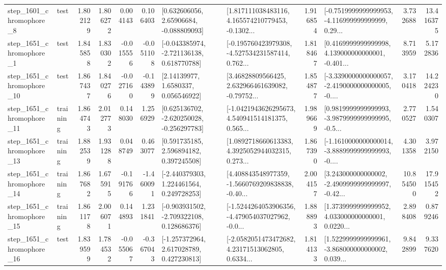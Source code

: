 \begin{tabular}{llrrrrllrlrr}
  step\_1601\_chromophore\_8 &      test &      1.802129 &    1.806272 &      0.004143 &  0.106403 &     [0.632606056, 2.65906684, -0.088809093] &  [1.817111038483116, 4.165574210779453, -0.1302... &       1.916854 &  [-0.7519999999999953, -4.116999999999999, 0.29... &            3.732688 &         13.416375 \\
  step\_1651\_chromophore\_1 &      test &      1.845858 &    1.830302 &     -0.015556 & -0.051108 &   [-0.043385974, -2.721136138, 0.618770788] &  [-0.195760423979308, -4.527534231587414, 0.762... &       1.818467 &  [0.4169999999999998, 4.139000000000001, -0.401... &            8.713959 &          5.172836 \\
 step\_1651\_chromophore\_10 &      test &      1.867437 &    1.840276 &     -0.027160 & -0.143899 &        [2.14139977, 1.6580337, 0.056546922] &  [3.46828809566425, 2.632966461639082, -0.79752... &       1.854877 &  [-3.3390000000000057, -2.4190000000000005, -0.... &            3.170418 &         14.224230 \\
 step\_1651\_chromophore\_11 &  training &      1.864743 &    2.012773 &      0.148030 &  1.256929 &   [0.625136702, -2.620250028, -0.256297783] &  [-1.0421943626295673, 4.540941514181375, 0.565... &       1.989669 &  [0.9819999999999993, -3.9879999999999995, -0.5... &            2.770527 &          1.540307 \\
 step\_1651\_chromophore\_13 &  training &      1.882539 &    1.931288 &      0.048749 &  0.463077 &     [0.591735185, 2.596894182, 0.397245508] &  [1.0892718660613383, 4.3925052944032315, 0.273... &       1.867390 &  [-1.1610000000000014, -3.8889999999999993, -0.... &            4.301358 &          3.972150 \\
 step\_1651\_chromophore\_14 &  training &      1.867682 &    1.675915 &     -0.191766 & -1.460091 &    [-2.440379303, 1.224461564, 0.249728253] &  [4.408843548977359, -1.5660769209838838, -0.40... &       2.004157 &  [3.243000000000002, -2.4909999999999997, -0.42... &           10.854500 &         17.915452 \\
 step\_1651\_chromophore\_15 &  training &      1.861178 &    2.006071 &      0.144893 &  1.231841 &   [-0.903931502, -2.709322108, 0.128686376] &  [-1.5244264053906356, -4.479054037027962, -0.0... &       1.888893 &  [1.3739999999999952, 4.033000000000001, 0.0220... &            2.898408 &          0.879246 \\
 step\_1651\_chromophore\_16 &      test &      1.839599 &    1.784532 &     -0.055067 & -0.367043 &    [-1.257372964, 2.617028789, 0.427230813] &  [-2.0582051473472682, 4.23171513062805, 0.6334... &       1.814133 &  [1.5229999999999961, -3.868000000000002, 0.039... &            9.842899 &          9.337620 \\

\end{tabular}
